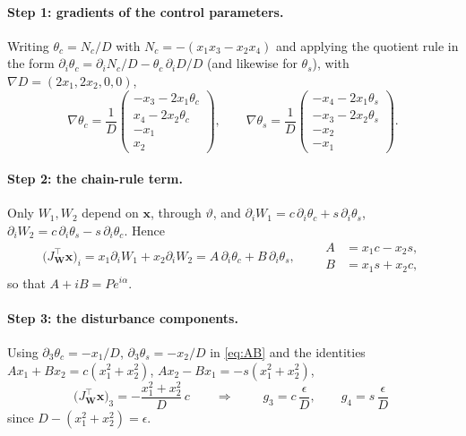 \documentclass[11pt]{article}
\newcommand{\vx}{\mathbf{x}}
\newcommand{\vW}{\mathbf{W}}
\begin{document}
\paragraph{Step 1: gradients of the control parameters.}
Writing $\theta_c=N_c/D$ with $N_c=-(x_1x_3-x_2x_4)$ and applying the
quotient rule in the form
$\partial_i\theta_c=\partial_iN_c/D-\theta_c\,\partial_iD/D$ (and likewise
for $\theta_s$), with $\nabla D=(2x_1,2x_2,0,0)$,
\begin{equation}
  \nabla\theta_c=\frac1D\begin{pmatrix}-x_3-2x_1\theta_c\\x_4-2x_2\theta_c\\-x_1\\x_2\end{pmatrix},
  \qquad
  \nabla\theta_s=\frac1D\begin{pmatrix}-x_4-2x_1\theta_s\\-x_3-2x_2\theta_s\\-x_2\\-x_1\end{pmatrix}.
  \label{eq:gradtheta}
\end{equation}

\paragraph{Step 2: the chain-rule term.}
Only $W_1,W_2$ depend on $\vx$, through $\vartheta$, and
$\partial_iW_1=c\,\partial_i\theta_c+s\,\partial_i\theta_s$,
$\partial_iW_2=c\,\partial_i\theta_s-s\,\partial_i\theta_c$. Hence
\begin{equation}
  \big(J_{\!\vW}^{\top}\vx\big)_i
  =x_1\partial_iW_1+x_2\partial_iW_2
  =A\,\partial_i\theta_c+B\,\partial_i\theta_s,
  \qquad
  \begin{aligned}
    A&=x_1c-x_2s,\\ B&=x_1s+x_2c,
  \end{aligned}
  \label{eq:AB}
\end{equation}
so that $A+iB=Pe^{i\alpha}$.

\paragraph{Step 3: the disturbance components.}
Using $\partial_3\theta_c=-x_1/D$, $\partial_3\theta_s=-x_2/D$ in
\eqref{eq:AB} and the identities
$Ax_1+Bx_2=c(x_1^2+x_2^2)$, $Ax_2-Bx_1=-s(x_1^2+x_2^2)$,
\begin{equation}
  \big(J_{\!\vW}^{\top}\vx\big)_3=-\frac{x_1^2+x_2^2}{D}\,c
  \qquad\Longrightarrow\qquad
  \boxed{\;g_3=c\,\frac{\epsilon}{D},\qquad g_4=s\,\frac{\epsilon}{D}\;}
  \label{eq:g34}
\end{equation}
since $D-(x_1^2+x_2^2)=\epsilon$.
\end{document}
